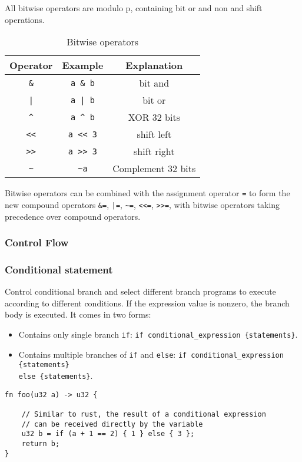 All bitwise operators are modulo p, containing bit or and non and shift operations.
\begin{table}
\centering
\begin{tabular}{c|c|c}
    Operator & Example & Explanation \\ \hline
    \verb|&| & \verb|a & b| & bit and \\
    \verb!|! & \verb!a | b! & bit or \\
    \verb|^| & \verb|a ^ b| & XOR 32 bits \\
    \verb|<<| & \verb|a << 3| & shift left \\
    \verb|>>| & \verb|a >> 3| & shift right \\
    \verb|~| & \verb|~a| & Complement 32  bits \\
\end{tabular}
\caption{Bitwise operators}
\end{table}

Bitwise operators can be combined with the assignment operator \verb|=| to form the new compound operators \verb|&=|, \verb!|=!, \verb|~=|, \verb|<<=|, \verb|>>=|, 
with bitwise operators taking precedence over compound operators.

\subsubsection{Control Flow}

\subsubsection*{Conditional statement}

Control conditional branch and select different branch programs to execute according to different conditions. 
If the expression value is nonzero, the branch body is executed.
It comes in two forms:

\begin{itemize}
    \item Contains only single branch \verb|if|: \verb|if conditional_expression {statements}|.
    \item Contains multiple branches of \verb|if| and \verb|else|: 
    \verb|if conditional_expression {statements}| \\
    \verb|else {statements}|.

\end{itemize}

\begin{lstlisting}
fn foo(u32 a) -> u32 {
    
    // Similar to rust, the result of a conditional expression 
    // can be received directly by the variable
    u32 b = if (a + 1 == 2) { 1 } else { 3 };
    return b;
}
\end{lstlisting}

